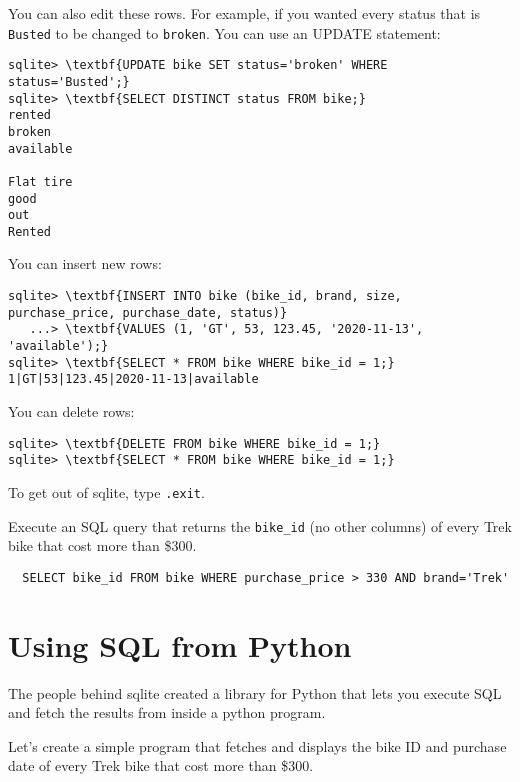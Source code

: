You can also edit these rows.  For example, if you wanted every status
that is \texttt{Busted} to be changed to \texttt{broken}. You can use an UPDATE statement:

\begin{Verbatim}[commandchars=\\\{\}]
sqlite> \textbf{UPDATE bike SET status='broken' WHERE status='Busted';}
sqlite> \textbf{SELECT DISTINCT status FROM bike;}
rented
broken
available

Flat tire
good
out
Rented
\end{Verbatim}

You can insert new rows:
\begin{Verbatim}[commandchars=\\\{\}]
sqlite> \textbf{INSERT INTO bike (bike_id, brand, size, purchase_price, purchase_date, status)}
   ...> \textbf{VALUES (1, 'GT', 53, 123.45, '2020-11-13', 'available');}
sqlite> \textbf{SELECT * FROM bike WHERE bike_id = 1;}
1|GT|53|123.45|2020-11-13|available
\end{Verbatim}

You can delete rows:
\begin{Verbatim}[commandchars=\\\{\}]
sqlite> \textbf{DELETE FROM bike WHERE bike_id = 1;}
sqlite> \textbf{SELECT * FROM bike WHERE bike_id = 1;}
\end{Verbatim}

To get out of sqlite, type \texttt{.exit}.

\begin{Exercise}[title={SQL Query}, label=sql_where]
  Execute an SQL query that returns the \texttt{bike\_id} (no other
  columns) of every Trek bike that cost more than \$300.
\end{Exercise}
\begin{Answer}[ref=sql_where]
\begin{Verbatim}
  SELECT bike_id FROM bike WHERE purchase_price > 330 AND brand='Trek'
\end{Verbatim}
\end{Answer}

\section{Using SQL from Python}

The people behind sqlite created a library for Python that lets you
execute SQL and fetch the results from inside a python program.

Let's create a simple program that fetches and displays the bike ID
and purchase date of every Trek bike that cost more than \$300.

